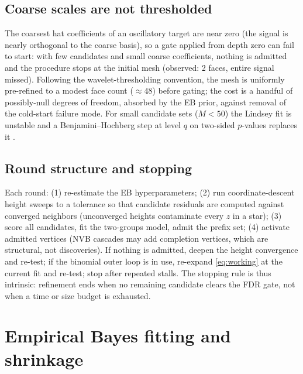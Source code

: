 \documentclass[11pt]{article}
\begin{document}
\subsection{Coarse scales are not thresholded}
The coarsest hat coefficients of an oscillatory target are near zero (the signal is
nearly orthogonal to the coarse basis), so a gate applied from depth zero can fail to
start: with few candidates and small coarse coefficients, nothing is admitted and the
procedure stops at the initial mesh (observed: 2 faces, entire signal missed).
Following the wavelet-thresholding convention, the mesh is uniformly pre-refined to a
modest face count ($\approx 48$) before gating; the cost is a handful of possibly-null
degrees of freedom, absorbed by the EB prior, against removal of the cold-start failure
mode. For small candidate sets ($M<50$) the Lindsey fit is unstable and a
Benjamini--Hochberg step at level $q$ on two-sided $p$-values replaces it
\cite{bh1995}.

\subsection{Round structure and stopping}
Each round: (1) re-estimate the EB hyperparameters; (2) run coordinate-descent height
sweeps to a tolerance so that candidate residuals are computed against converged
neighbors (unconverged heights contaminate every $z$ in a star); (3) score all
candidates, fit the two-groups model, admit the prefix set; (4) activate admitted
vertices (NVB cascades may add completion vertices, which are structural, not
discoveries). If nothing is admitted, deepen the height convergence and re-test; if the
binomial outer loop is in use, re-expand \eqref{eq:working} at the current fit and
re-test; stop after repeated stalls. The stopping rule is thus intrinsic: refinement
ends when no remaining candidate clears the FDR gate, not when a time or size budget is
exhausted.

\section{Empirical Bayes fitting and shrinkage}\label{sec:eb}
\end{document}

